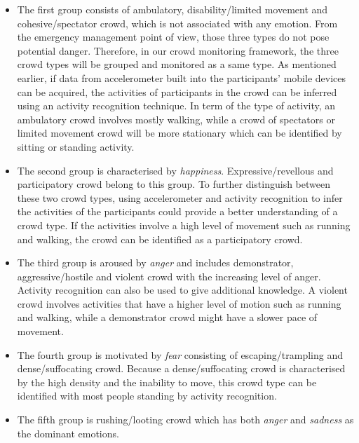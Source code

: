 \begin{itemize}
\item The first group consists of ambulatory, disability/limited movement and cohesive/spectator crowd, which is not associated with any emotion. From the emergency management point of view, those three types do not pose potential danger. Therefore, in our crowd monitoring framework, the three crowd types will be grouped and monitored as a same type. As mentioned earlier, if data from accelerometer built into the participants' mobile devices can be acquired, the activities of participants in the crowd can be inferred using an activity recognition technique. In term of the type of activity, an ambulatory crowd involves mostly walking, while a crowd of spectators or limited movement crowd will be more stationary which can be identified by sitting or standing activity.

\item The second group is characterised by \textit{happiness}. Expressive/revellous and participatory crowd belong to this group. To further distinguish between these two crowd types, using accelerometer and activity recognition to infer the activities of the participants could provide a better understanding of a crowd type. If the activities involve a high level of movement such as running and walking, the crowd can be identified as a participatory crowd.

\item The third group is aroused by \textit{anger} and includes demonstrator, aggressive/hostile and violent crowd with the increasing level of anger. Activity recognition can also be used to give additional knowledge. A violent crowd involves activities that have a higher level of motion such as running and walking, while a demonstrator crowd might have a slower pace of movement.

\item The fourth group is motivated by \textit{fear} consisting of escaping/trampling and dense/suffocating crowd. Because a dense/suffocating crowd is characterised by the high density and the inability to move, this crowd type can be identified with most people standing by activity recognition.

\item The fifth group is rushing/looting crowd which has both \textit{anger} and \textit{sadness} as the dominant emotions.
\end{itemize}

